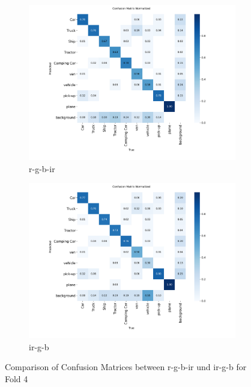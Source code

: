 \begin{figure}[h] 
    \centering
    \begin{subfigure}[b]{0.85\textwidth} %
        \includegraphics[width=\textwidth]{images/confusion_matrices/rgbir_F4_confusion_matrix_normalized.png} %
        \caption{r-g-b-ir} %
        \label{fig:cm_trgbir} %
    \end{subfigure}
    \hfill %
    \begin{subfigure}[b]{0.85\textwidth} %
        \includegraphics[width=\textwidth]{images/confusion_matrices/irgb_F4_confusion_matrix_normalized.png} %
        \caption{ir-g-b} %
        \label{fig:cm_irgb} %
    \end{subfigure}
    \caption{Comparison of Confusion Matrices between r-g-b-ir und ir-g-b for Fold 4} %
    \label{fig:combined_maps} %
\end{figure}